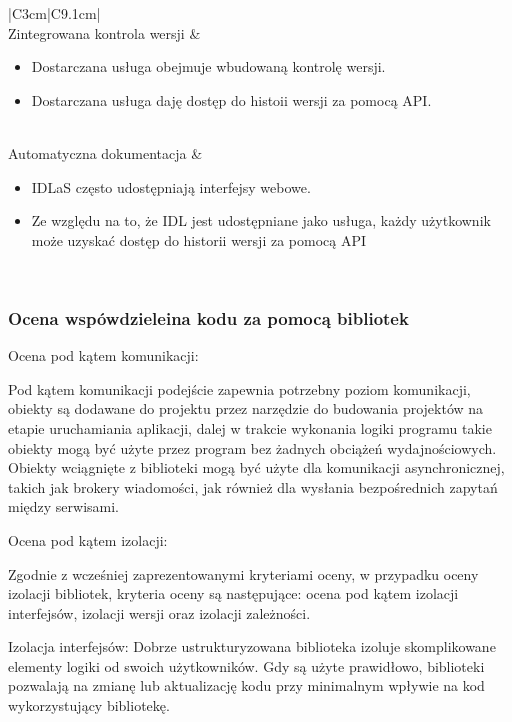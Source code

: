 \documentclass[runningheads,12pt]{llncs}
\begin{document}
\begin{longtable}{|C{3cm}|C{9.1cm}|}
     \\ \hline
    Zintegrowana kontrola wersji &
    \begin{itemize}
      \item Dostarczana usługa obejmuje wbudowaną kontrolę wersji.
      \item Dostarczana usługa daję dostęp do histoii wersji za pomocą API.
    \end{itemize} \\ \hline
    Automatyczna dokumentacja &
    \begin{itemize}
      \item IDLaS często udostępniają interfejsy webowe.
      \item Ze względu na to, że IDL jest udostępniane jako usługa, każdy użytkownik może uzyskać dostęp do historii wersji za pomocą API
    \end{itemize} \\ \hline

\end{longtable}

\subsubsection{Ocena wspówdzieleina kodu za pomocą bibliotek}

Ocena pod kątem komunikacji:

Pod kątem komunikacji podejście zapewnia potrzebny poziom komunikacji, obiekty są dodawane do projektu przez narzędzie do budowania projektów na etapie uruchamiania aplikacji, dalej w trakcie wykonania logiki programu takie obiekty mogą być użyte przez program bez żadnych obciążeń wydajnościowych. Obiekty wciągnięte z biblioteki mogą być użyte dla komunikacji asynchronicznej, takich jak brokery wiadomości, jak również dla wysłania bezpośrednich zapytań między serwisami.

Ocena pod kątem izolacji:

Zgodnie z wcześniej zaprezentowanymi kryteriami oceny, w przypadku oceny izolacji bibliotek, kryteria oceny są następujące: ocena pod kątem izolacji interfejsów, izolacji wersji oraz izolacji zależności.

Izolacja interfejsów: Dobrze ustrukturyzowana biblioteka izoluje skomplikowane elementy logiki od swoich użytkowników. Gdy są użyte prawidłowo, biblioteki pozwalają na zmianę lub aktualizację kodu przy minimalnym wpływie na kod wykorzystujący bibliotekę.
\end{document}
